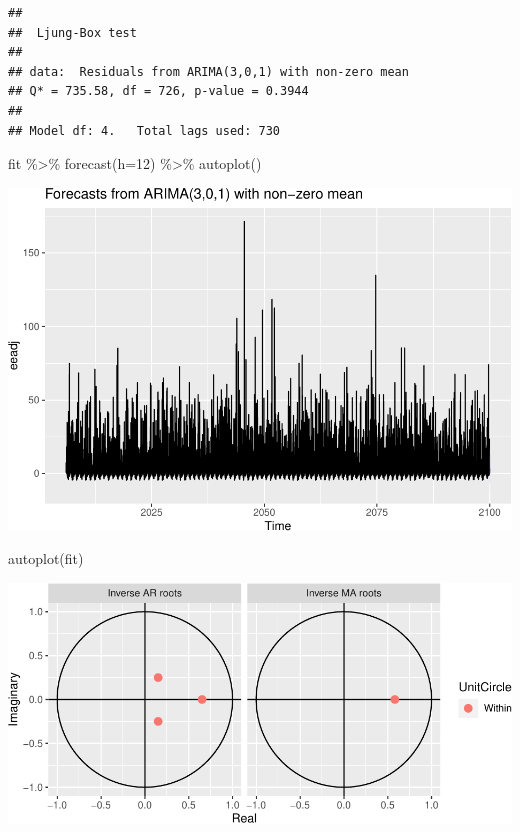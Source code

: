 \documentclass[
  paper=a4,
  ,captions=tableheading
]{scrartcl}
\newenvironment{Shaded}{\begin{snugshade}}{\end{snugshade}}
\newcommand{\AttributeTok}[1]{\textcolor[rgb]{0.77,0.63,0.00}{#1}}
\newcommand{\DecValTok}[1]{\textcolor[rgb]{0.00,0.00,0.81}{#1}}
\newcommand{\FunctionTok}[1]{\textcolor[rgb]{0.00,0.00,0.00}{#1}}
\newcommand{\NormalTok}[1]{#1}
\newcommand{\SpecialCharTok}[1]{\textcolor[rgb]{0.00,0.00,0.00}{#1}}
\begin{document}
\begin{verbatim}
## 
##  Ljung-Box test
## 
## data:  Residuals from ARIMA(3,0,1) with non-zero mean
## Q* = 735.58, df = 726, p-value = 0.3944
## 
## Model df: 4.   Total lags used: 730
\end{verbatim}

\begin{Shaded}
\begin{Highlighting}[]
\NormalTok{fit }\SpecialCharTok{\%\textgreater{}\%} \FunctionTok{forecast}\NormalTok{(}\AttributeTok{h=}\DecValTok{12}\NormalTok{) }\SpecialCharTok{\%\textgreater{}\%} \FunctionTok{autoplot}\NormalTok{()}
\end{Highlighting}
\end{Shaded}

\includegraphics{Haskell_files/figure-latex/unnamed-chunk-90-1.pdf}

\begin{Shaded}
\begin{Highlighting}[]
\FunctionTok{autoplot}\NormalTok{(fit)}
\end{Highlighting}
\end{Shaded}

\includegraphics{Haskell_files/figure-latex/unnamed-chunk-90-2.pdf}
\end{document}
